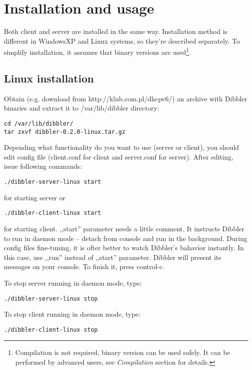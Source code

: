 
\section{Installation and usage}
Both client and server are installed in the same way. Installation
method is different in WindowsXP and Linux systems, so they're described
separately. To simplify installation, it assumes that binary versions
are used\footnote{Compilation is not
  required, binary version can be used safely. It can be performed by
  advanced users, see \emph{Compilation} section for details.}.

\subsection{Linux installation}
Obtain (e.g. download from http://klub.com.pl/dhcpv6/) an archive with
Dibbler binaries and extract it to /var/lib/dibbler directory:
\begin{verbatim}
cd /var/lib/dibbler/
tar zxvf dibbler-0.2.0-linux.tar.gz 
\end{verbatim}

Depending what functionality do you want to use (server or client),
you should edit config file (client.conf for client and server.conf
for server). After editing, issue following commands:

\begin{verbatim}
./dibbler-server-linux start
\end{verbatim}

for starting server or

\begin{verbatim}
./dibbler-client-linux start
\end{verbatim}

for starting client. ,,start'' parameter needs a little comment. It
instructs Dibbler to run in daemon mode -- detach from console and run
in the background. During config files fine-tuning, it is ofter better
to watch Dibbler's bahavior instantly. In this case, use ,,run''
instead of ,,start'' parameter. Dibbler will present its messages on
your console. To finish it, press control-c.

To stop server running in daemon mode, type:
\begin{verbatim}
./dibbler-server-linux stop
\end{verbatim}

To stop client running in daemon mode, type:
\begin{verbatim}
./dibbler-client-linux stop
\end{verbatim}


